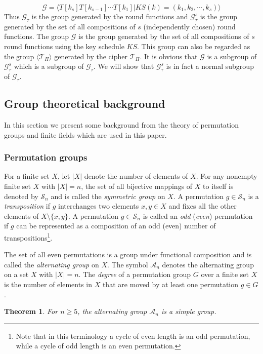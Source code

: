 \documentclass[11pt]{amsart}
\newcommand{\GG}{\mathcal{G}}
\newcommand{\TT}{\mathcal{T}}
\newcommand{\alt}{\mathcal{A}}
\newcommand{\sym}{\mathcal{S}}
\newtheorem{theorem}{{\bf Theorem }}
\begin{document}
$$\GG=\langle T[k_s]T[k_{s-1}]\cdots T[k_1]\vert KS(k)=(k_1,k_2,\cdots,k_s)\rangle$$
Thus $\GG_{\tau}$ is the group generated by the round functions and $\GG_{\tau}^s$ is the group generated by the set of all compositions of $s$ (independently chosen) round functions. The group $\GG$ is the group generated by the set of all compositions of $s$ round functions using the key schedule $KS$. This group can also be regarded as the group $\langle\TT_{\Pi}\rangle$ generated by the cipher $\TT_{\Pi}$. It is obvious that $\GG$ is a subgroup of $\GG_{\tau}^s$ which is a subgroup of $\GG_{\tau}$. We will show that $\GG_{\tau}^s$ is in fact a normal subgroup of $\GG_{\tau}$. 




\subsection {Group theoretical background}

In this section we present some background from the theory of permutation groups and finite fields which are used in this paper.
\subsubsection{\bf Permutation groups} 

For a finite set $X$, let $\vert X\vert$ denote the number of elements of $X$. For any nonempty finite set $X$ with $\vert X\vert=n$, the set of all bijective mappings of $X$ to itself is denoted by $\sym_n$ and is called the \emph{symmetric group} on $X$. A permutation $g\in \sym_n$ is a \emph {transposition} if $g$ interchanges two elements $x,y\in X$ and fixes all the other elements of $X\setminus \{x,y\}$. A permutation $g\in \sym_n$ is called an \emph {odd} (\emph{even})  permutation if $g$ can be represented as a composition of an odd (even) number of transpositions\footnote{Note that in this terminology a cycle of even length is an odd permutation, while a cycle of odd length is an even permutation.}.

The set of all even permutations is a group under functional composition and is called the \emph{alternating group} on $X$. The symbol $\alt_n$ denotes the alternating group on a set $X$ with $\vert X\vert=n$. The \emph{degree} of a permutation group $G$ over a finite set $X$ is the number of elements in $X$ that are moved by at least one permutation $g\in G$.
\begin{theorem} \label{simple}  
For $n\geq 5$, the alternating group $\alt_n$ is a simple group.
\end{theorem}
\end{document}
